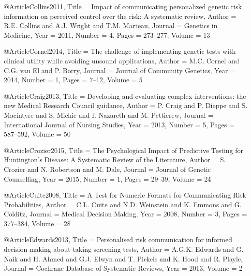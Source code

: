 @Article{Collins2011,
  Title                    = {Impact of communicating personalized genetic risk information on perceived control over the risk: A systematic review},
  Author                   = {R.E. Collins and A.J. Wright and T.M. Marteau},
  Journal                  = {Genetics in Medicine},
  Year                     = {2011},
  Number                   = {4},
  Pages                    = {273--277},
  Volume                   = {13}
}

@Article{Cornel2014,
  Title                    = {The challenge of implementing genetic tests with clinical utility while avoiding unsound applications},
  Author                   = {M.C. Cornel and C.G. van El and P. Borry},
  Journal                  = {Journal of Community Genetics},
  Year                     = {2014},
  Number                   = {1},
  Pages                    = {7--12},
  Volume                   = {5}
}

@Article{Craig2013,
  Title                    = {Developing and evaluating complex interventions: the new Medical Research Council guidance},
  Author                   = {P. Craig and P. Dieppe and S. Macintyre and S. Michie and I. Nazareth and M. Petticrew},
  Journal                  = {International Journal of Nursing Studies},
  Year                     = {2013},
  Number                   = {5},
  Pages                    = {587--592},
  Volume                   = {50}
}

@Article{Crozier2015,
  Title                    = {The Psychological Impact of Predictive Testing for Huntington's Disease: A Systematic Review of the Literature},
  Author                   = {S. Crozier and N. Robertson and M. Dale},
  Journal                  = {Journal of Genetic Counselling},
  Year                     = {2015},
  Number                   = {1},
  Pages                    = {29--39},
  Volume                   = {24}
}

@Article{Cuite2008,
  Title                    = {A Test for Numeric Formats for Communicating Risk Probabilities},
  Author                   = {C.L. Cuite and N.D. Weinstein and K. Emmons and G. Colditz},
  Journal                  = {Medical Decision Making},
  Year                     = {2008},
  Number                   = {3},
  Pages                    = {377--384},
  Volume                   = {28}
}

@Article{Edwards2013,
  Title                    = {Personalised risk communication for informed decision making about taking screening tests},
  Author                   = {A.G.K. Edwards and G. Naik and H. Ahmed and G.J. Elwyn and T. Pickels and K. Hood and R. Playle},
  Journal                  = {Cochrane Database of Systematic Reviews},
  Year                     = {2013},
  Volume                   = {2}
}

